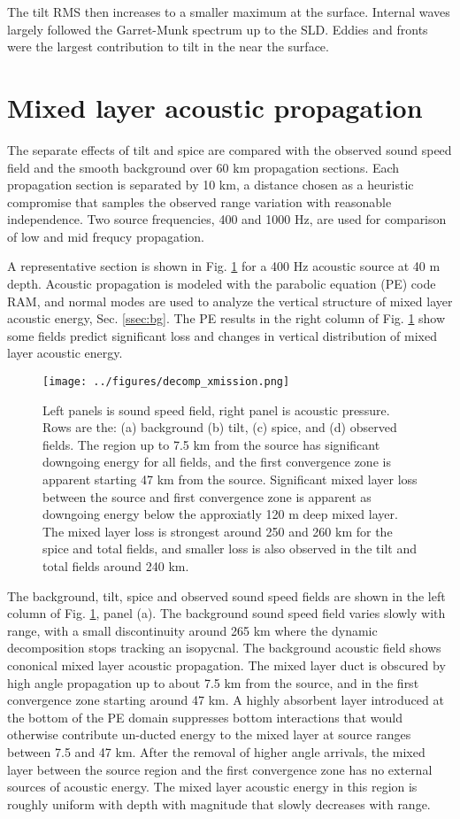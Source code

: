 \documentclass[preprint,NumberedRefs]{JASA}
\begin{document}
The tilt RMS then increases to a smaller maximum at the surface. Internal waves largely followed the Garret-Munk spectrum up to the SLD. Eddies and fronts were the largest contribution to tilt in the near the surface.

\section{\label{sec:propagation}Mixed layer acoustic propagation}
The separate effects of tilt and spice are compared with the observed sound speed field and the smooth background over 60 km propagation sections. Each propagation section is separated by 10 km, a distance chosen as a heuristic compromise that samples the observed range variation with reasonable independence. Two source frequencies, 400 and 1000 Hz, are used for comparison of low and mid frequcy propagation.

A representative section is shown in Fig. \ref{fig:decomp_x} for a 400 Hz acoustic source at 40 m depth. Acoustic propagation is modeled with the parabolic equation (PE) code RAM, and normal modes are used to analyze the vertical structure of mixed layer acoustic energy, Sec. \ref{ssec:bg}. The PE results in the right column of Fig. \ref{fig:decomp_x} show some fields predict significant loss and changes in vertical distribution of mixed layer acoustic energy.

\begin{figure}
\texttt{[image: ../figures/decomp\_xmission.png]}
    \caption{\label{fig:decomp_x}{Left panels is sound speed field, right panel is acoustic pressure. Rows are the: (a) background (b) tilt, (c) spice, and (d) observed fields. The region up to 7.5 km from the source has significant downgoing energy for all fields, and the first convergence zone is apparent starting 47 km from the source. Significant mixed layer loss between the source and first convergence zone is apparent as downgoing energy below the approxiatly 120 m deep mixed layer. The mixed layer loss is strongest around 250 and 260 km for the spice and total fields, and smaller loss is also observed in the tilt and total fields around 240 km.}}
\end{figure}

The background, tilt, spice and observed sound speed fields are shown in the left column of Fig. \ref{fig:decomp_x}, panel (a). The background sound speed field varies slowly with range, with a small discontinuity around 265 km where the dynamic decomposition stops tracking an isopycnal. The background acoustic field shows cononical mixed layer acoustic propagation. The mixed layer duct is obscured by high angle propagation up to about 7.5 km from the source, and in the first convergence zone starting around 47 km. A highly absorbent layer introduced at the bottom of the PE domain suppresses bottom interactions that would otherwise contribute un-ducted energy to the mixed layer at source ranges between 7.5 and 47 km. After the removal of higher angle arrivals, the mixed layer between the source region and the first convergence zone has no external sources of acoustic energy. The mixed layer acoustic energy in this region is roughly uniform with depth with magnitude that slowly decreases with range.
\end{document}
